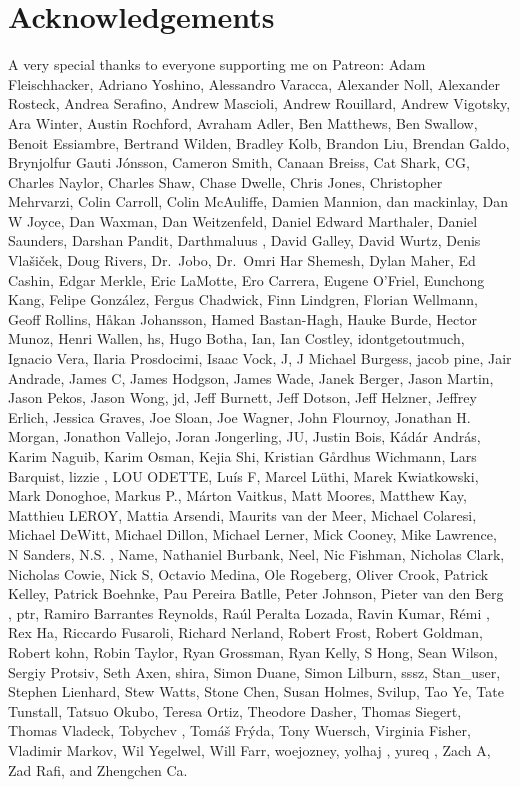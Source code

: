 \documentclass[
  letterpaper,
  DIV=11,
  numbers=noendperiod]{scrartcl}
\begin{document}
\section*{Acknowledgements}\label{acknowledgements}

A very special thanks to everyone supporting me on Patreon: Adam
Fleischhacker, Adriano Yoshino, Alessandro Varacca, Alexander Noll,
Alexander Rosteck, Andrea Serafino, Andrew Mascioli, Andrew Rouillard,
Andrew Vigotsky, Ara Winter, Austin Rochford, Avraham Adler, Ben
Matthews, Ben Swallow, Benoit Essiambre, Bertrand Wilden, Bradley Kolb,
Brandon Liu, Brendan Galdo, Brynjolfur Gauti Jónsson, Cameron Smith,
Canaan Breiss, Cat Shark, CG, Charles Naylor, Charles Shaw, Chase
Dwelle, Chris Jones, Christopher Mehrvarzi, Colin Carroll, Colin
McAuliffe, Damien Mannion, dan mackinlay, Dan W Joyce, Dan Waxman, Dan
Weitzenfeld, Daniel Edward Marthaler, Daniel Saunders, Darshan Pandit,
Darthmaluus , David Galley, David Wurtz, Denis Vlašiček, Doug Rivers,
Dr.~Jobo, Dr.~Omri Har Shemesh, Dylan Maher, Ed Cashin, Edgar Merkle,
Eric LaMotte, Ero Carrera, Eugene O'Friel, Eunchong Kang, Felipe
González, Fergus Chadwick, Finn Lindgren, Florian Wellmann, Geoff
Rollins, Håkan Johansson, Hamed Bastan-Hagh, Hauke Burde, Hector Munoz,
Henri Wallen, hs, Hugo Botha, Ian, Ian Costley, idontgetoutmuch, Ignacio
Vera, Ilaria Prosdocimi, Isaac Vock, J, J Michael Burgess, jacob pine,
Jair Andrade, James C, James Hodgson, James Wade, Janek Berger, Jason
Martin, Jason Pekos, Jason Wong, jd, Jeff Burnett, Jeff Dotson, Jeff
Helzner, Jeffrey Erlich, Jessica Graves, Joe Sloan, Joe Wagner, John
Flournoy, Jonathan H. Morgan, Jonathon Vallejo, Joran Jongerling, JU,
Justin Bois, Kádár András, Karim Naguib, Karim Osman, Kejia Shi,
Kristian Gårdhus Wichmann, Lars Barquist, lizzie , LOU ODETTE, Luís F,
Marcel Lüthi, Marek Kwiatkowski, Mark Donoghoe, Markus P., Márton
Vaitkus, Matt Moores, Matthew Kay, Matthieu LEROY, Mattia Arsendi,
Maurits van der Meer, Michael Colaresi, Michael DeWitt, Michael Dillon,
Michael Lerner, Mick Cooney, Mike Lawrence, N Sanders, N.S. , Name,
Nathaniel Burbank, Neel, Nic Fishman, Nicholas Clark, Nicholas Cowie,
Nick S, Octavio Medina, Ole Rogeberg, Oliver Crook, Patrick Kelley,
Patrick Boehnke, Pau Pereira Batlle, Peter Johnson, Pieter van den Berg
, ptr, Ramiro Barrantes Reynolds, Raúl Peralta Lozada, Ravin Kumar, Rémi
, Rex Ha, Riccardo Fusaroli, Richard Nerland, Robert Frost, Robert
Goldman, Robert kohn, Robin Taylor, Ryan Grossman, Ryan Kelly, S Hong,
Sean Wilson, Sergiy Protsiv, Seth Axen, shira, Simon Duane, Simon
Lilburn, sssz, Stan\_user, Stephen Lienhard, Stew Watts, Stone Chen,
Susan Holmes, Svilup, Tao Ye, Tate Tunstall, Tatsuo Okubo, Teresa Ortiz,
Theodore Dasher, Thomas Siegert, Thomas Vladeck, Tobychev , Tomáš Frýda,
Tony Wuersch, Virginia Fisher, Vladimir Markov, Wil Yegelwel, Will Farr,
woejozney, yolhaj , yureq , Zach A, Zad Rafi, and Zhengchen Ca.
\end{document}
